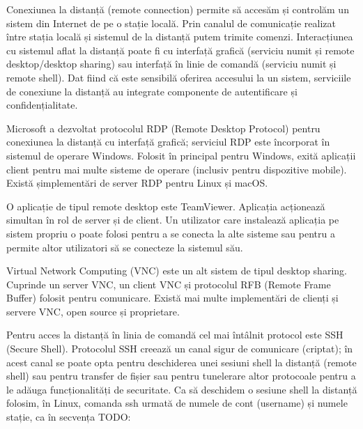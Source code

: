 Conexiunea la distanță (remote connection) permite să accesăm și controlăm un sistem din Internet de pe o stație locală. Prin canalul de comunicație realizat între stația locală și sistemul de la distanță putem trimite comenzi. Interacțiunea cu sistemul aflat la distanță poate fi cu interfață grafică (serviciu numit și remote desktop/desktop sharing) sau interfață în linie de comandă (serviciu numit și remote shell). Dat fiind că este sensibilă oferirea accesului la un sistem, serviciile de conexiune la distanță au integrate componente de autentificare și confidențialitate.

Microsoft a dezvoltat protocolul RDP (Remote Desktop Protocol) pentru conexiunea la distanță cu interfață grafică; serviciul RDP este încorporat în sistemul de operare Windows. Folosit în principal pentru Windows, exită aplicații client pentru mai multe sisteme de operare (inclusiv pentru dispozitive mobile). Există șimplementări de server RDP pentru Linux și macOS.

O aplicație de tipul remote desktop este TeamViewer. Aplicația acționează simultan în rol de server și de client. Un utilizator care instalează aplicația pe sistem propriu o poate folosi pentru a se conecta la alte sisteme sau pentru a permite altor utilizatori să se conecteze la sistemul său.

Virtual Network Computing (VNC) este un alt sistem de tipul desktop sharing. Cuprinde un server VNC, un client VNC și protocolul RFB (Remote Frame Buffer) folosit pentru comunicare. Există mai multe implementări de clienți și servere VNC, open source și proprietare.

Pentru acces la distanță în linia de comandă cel mai întâlnit protocol este SSH (Secure Shell). Protocolul SSH creează un canal sigur de comunicare (criptat); în acest canal se poate opta pentru deschiderea unei sesiuni shell la distanță (remote shell) sau pentru transfer de fișier sau pentru tunelerare altor protocoale pentru a le adăuga funcționalități de securitate. Ca să deschidem o sesiune shell la distanță folosim, în Linux, comanda ssh urmată de numele de cont (username) și numele stație, ca în secvența TODO:


